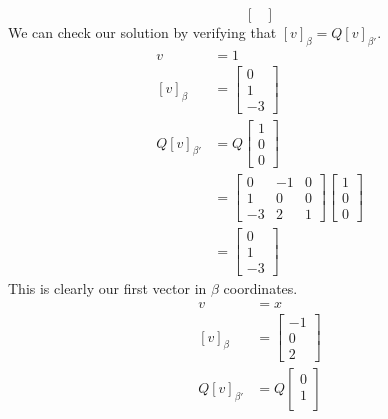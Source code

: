 \documentclass[answers,12pt,addpoints]{exam}
\begin{document}
\begin{questions}
\begin{solution}
$$\begin{bmatrix}
        \end{bmatrix}$$
        We can check our solution by verifying that $[v]_{\beta} = Q[v]_{\beta'}$.
        \begin{align*}
            v &= 1\\
            [v]_{\beta} &= \begin{bmatrix}
                0 \\
                1\\
                -3
            \end{bmatrix}   \\
            Q[v]_{\beta'} &= Q\begin{bmatrix}
                1\\
                0\\
                0
            \end{bmatrix}\\
            &= \begin{bmatrix}
                0 & -1 & 0\\
                1 & 0 & 0\\
                -3 & 2 & 1
            \end{bmatrix}\begin{bmatrix}
                1\\
                0\\
                0
            \end{bmatrix}\\
            &= \begin{bmatrix}
                0 \\
                1\\
                -3
            \end{bmatrix}
        \end{align*}
        This is clearly our first vector in $\beta$ coordinates.
        \begin{align*}
            v &= x\\
            [v]_{\beta} &= \begin{bmatrix}
                -1 \\
                0\\
                2
            \end{bmatrix}   \\
            Q[v]_{\beta'} &= Q\begin{bmatrix}
                0\\
                1\\

\end{bmatrix}
\end{align*}
\end{solution}
\end{questions}
\end{document}
